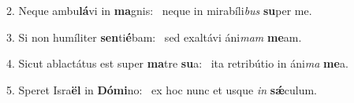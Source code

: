 2. Neque ambu\textbf{lá}vi in \textbf{ma}gnis: \ast\  neque in mirabíli\textit{bus} \textbf{su}per me.\

3. Si non humíliter \textbf{sen}ti\textbf{é}bam: \ast\  sed exaltávi áni\textit{mam} \textbf{me}am.\

4. Sicut ablactátus est super \textbf{ma}tre \textbf{su}a: \ast\  ita retribútio in áni\textit{ma} \textbf{me}a.\

5. Speret Isra\textbf{ël} in \textbf{Dó}\textbf{mi}no: \ast\  ex hoc nunc et usque \textit{in} \textbf{sǽ}culum.\

